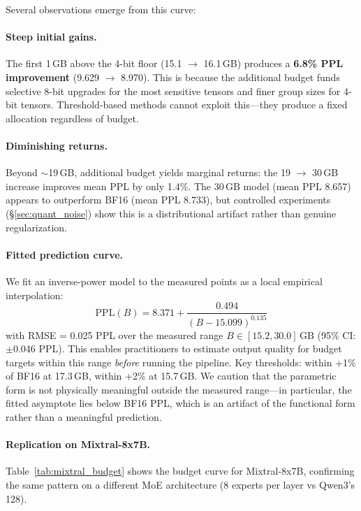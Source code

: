 \documentclass{article}
\begin{document}
Several observations emerge from this curve:

\paragraph{Steep initial gains.} The first 1\,GB above the 4-bit floor (15.1 $\rightarrow$ 16.1\,GB) produces a \textbf{6.8\% PPL improvement} (9.629 $\rightarrow$ 8.970). This is because the additional budget funds selective 8-bit upgrades for the most sensitive tensors and finer group sizes for 4-bit tensors. Threshold-based methods cannot exploit this---they produce a fixed allocation regardless of budget.

\paragraph{Diminishing returns.} Beyond ${\sim}$19\,GB, additional budget yields marginal returns: the 19 $\rightarrow$ 30\,GB increase improves mean PPL by only 1.4\%. The 30\,GB model (mean PPL 8.657) appears to outperform BF16 (mean PPL 8.733), but controlled experiments (\S\ref{sec:quant_noise}) show this is a distributional artifact rather than genuine regularization.

\paragraph{Fitted prediction curve.} We fit an inverse-power model to the measured points as a local empirical interpolation:
\begin{equation}
    \text{PPL}(B) = 8.371 + \frac{0.494}{(B - 15.099)^{0.135}}
    \label{eq:ppl_curve}
\end{equation}
with RMSE = 0.025 PPL over the measured range $B \in [15.2, 30.0]$\,GB (95\% CI: $\pm$0.046 PPL). This enables practitioners to estimate output quality for budget targets within this range \emph{before} running the pipeline. Key thresholds: within +1\% of BF16 at 17.3\,GB, within +2\% at 15.7\,GB. We caution that the parametric form is not physically meaningful outside the measured range---in particular, the fitted asymptote lies below BF16 PPL, which is an artifact of the functional form rather than a meaningful prediction.

\paragraph{Replication on Mixtral-8x7B.} Table~\ref{tab:mixtral_budget} shows the budget curve for Mixtral-8x7B, confirming the same pattern on a different MoE architecture (8 experts per layer vs Qwen3's 128).
\end{document}
